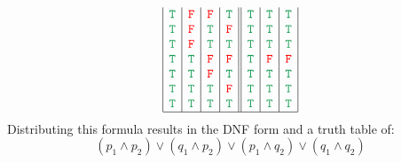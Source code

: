 \documentclass{article}
\begin{document}
\[\begin{array}{|c|c|c|c||c|c|c|}
\textcolor{ForestGreen}{\tt{T}}&\textcolor{red}{\tt{F}}&\textcolor{red}{\tt{F}}&\textcolor{ForestGreen}{\tt{T}}&\textcolor{ForestGreen}{\tt{T}}&\textcolor{ForestGreen}{\tt{T}}&\textcolor{ForestGreen}{\tt{T}}\\
\textcolor{ForestGreen}{\tt{T}}&\textcolor{red}{\tt{F}}&\textcolor{ForestGreen}{\tt{T}}&\textcolor{red}{\tt{F}}&\textcolor{ForestGreen}{\tt{T}}&\textcolor{ForestGreen}{\tt{T}}&\textcolor{ForestGreen}{\tt{T}}\\
\textcolor{ForestGreen}{\tt{T}}&\textcolor{red}{\tt{F}}&\textcolor{ForestGreen}{\tt{T}}&\textcolor{ForestGreen}{\tt{T}}&\textcolor{ForestGreen}{\tt{T}}&\textcolor{ForestGreen}{\tt{T}}&\textcolor{ForestGreen}{\tt{T}}\\
\textcolor{ForestGreen}{\tt{T}}&\textcolor{ForestGreen}{\tt{T}}&\textcolor{red}{\tt{F}}&\textcolor{red}{\tt{F}}&\textcolor{ForestGreen}{\tt{T}}&\textcolor{red}{\tt{F}}&\textcolor{red}{\tt{F}}\\
\textcolor{ForestGreen}{\tt{T}}&\textcolor{ForestGreen}{\tt{T}}&\textcolor{red}{\tt{F}}&\textcolor{ForestGreen}{\tt{T}}&\textcolor{ForestGreen}{\tt{T}}&\textcolor{ForestGreen}{\tt{T}}&\textcolor{ForestGreen}{\tt{T}}\\
\textcolor{ForestGreen}{\tt{T}}&\textcolor{ForestGreen}{\tt{T}}&\textcolor{ForestGreen}{\tt{T}}&\textcolor{red}{\tt{F}}&\textcolor{ForestGreen}{\tt{T}}&\textcolor{ForestGreen}{\tt{T}}&\textcolor{ForestGreen}{\tt{T}}\\
\textcolor{ForestGreen}{\tt{T}}&\textcolor{ForestGreen}{\tt{T}}&\textcolor{ForestGreen}{\tt{T}}&\textcolor{ForestGreen}{\tt{T}}&\textcolor{ForestGreen}{\tt{T}}&\textcolor{ForestGreen}{\tt{T}}&\textcolor{ForestGreen}{\tt{T}}\\
\hline
\end{array}\]
Distributing this formula results in the DNF form and a truth table of:
\[(p_1\land p_2)\lor(q_1\land p_2)\lor(p_1\land q_2)\lor(q_1\land q_2)\]
\end{document}
